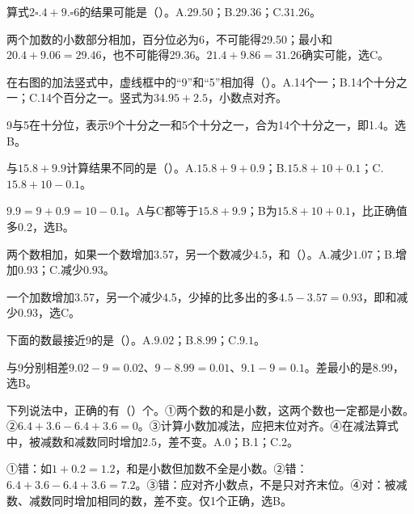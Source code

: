 算式\(2\square.4+9.\square6\)的结果可能是（\hspace{1.8em}）。A.\(29.50\)；B.\(29.36\)；C.\(31.26\)。\par
\begin{BookAnswer}
两个加数的小数部分相加，百分位必为6，不可能得29.50；最小和\(20.4+9.06=29.46\)，也不可能得29.36。\(21.4+9.86=31.26\)确实可能，选C。
\end{BookAnswer}

在右图的加法竖式中，虚线框中的“9”和“5”相加得（\hspace{1.8em}）。A.14个一；B.14个十分之一；C.14个百分之一。竖式为\(34.95+2.5\)，小数点对齐。\par
{}
\begin{BookAnswer}
9与5在十分位，表示9个十分之一和5个十分之一，合为14个十分之一，即1.4。选B。
\end{BookAnswer}

与\(15.8+9.9\)计算结果不同的是（\hspace{1.8em}）。A.\(15.8+9+0.9\)；B.\(15.8+10+0.1\)；C.\(15.8+10-0.1\)。\par
\begin{BookAnswer}
\(9.9=9+0.9=10-0.1\)。A与C都等于\(15.8+9.9\)；B为\(15.8+10+0.1\)，比正确值多0.2，选B。
\end{BookAnswer}

两个数相加，如果一个数增加\(3.57\)，另一个数减少\(4.5\)，和（\hspace{1.8em}）。A.减少\(1.07\)；B.增加\(0.93\)；C.减少\(0.93\)。\par
\begin{BookAnswer}
一个加数增加3.57，另一个减少4.5，少掉的比多出的多\(4.5-3.57=0.93\)，即和减少0.93，选C。
\end{BookAnswer}

下面的数最接近9的是（\hspace{1.8em}）。A.\(9.02\)；B.\(8.99\)；C.\(9.1\)。\par
\begin{BookAnswer}
与9分别相差\(9.02-9=0.02\)、\(9-8.99=0.01\)、\(9.1-9=0.1\)。差最小的是8.99，选B。
\end{BookAnswer}

下列说法中，正确的有（\hspace{1.8em}）个。①两个数的和是小数，这两个数也一定都是小数。②\(6.4+3.6-6.4+3.6=0\)。③计算小数加减法，应把末位对齐。④在减法算式中，被减数和减数同时增加\(2.5\)，差不变。A.0；B.1；C.2。\par
\begin{BookAnswer}
①错：如\(1+0.2=1.2\)，和是小数但加数不全是小数。②错：\(6.4+3.6-6.4+3.6=7.2\)。③错：应对齐小数点，不是只对齐末位。④对：被减数、减数同时增加相同的数，差不变。仅1个正确，选B。
\end{BookAnswer}

